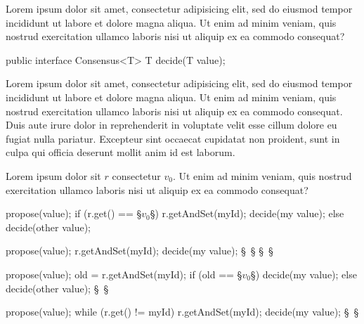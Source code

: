 \question 
\begin{splitquestion}{0.32}
Lorem ipsum dolor sit amet, consectetur adipisicing elit, sed do eiusmod tempor incididunt ut labore et dolore magna aliqua. Ut enim ad minim veniam, quis nostrud exercitation ullamco laboris nisi ut aliquip ex ea commodo consequat?
\nextpart
\begin{java}
public interface Consensus<T> {
    T decide(T value);
}
\end{java}
\end{splitquestion}
\begin{choices} %
\choice Lorem ipsum dolor sit amet, consectetur adipisicing elit, sed do eiusmod tempor incididunt ut labore et dolore magna aliqua.
\CHOICE Ut enim ad minim veniam, quis nostrud exercitation ullamco laboris nisi ut aliquip ex ea commodo consequat.
\choice Duis aute irure dolor in reprehenderit in voluptate velit esse cillum dolore eu fugiat nulla pariatur.
\choice Excepteur sint occaecat cupidatat non proident, sunt in culpa qui officia deserunt mollit anim id est laborum.
\end{choices}



\question
{}
Lorem ipsum dolor sit \(r\) consectetur \(v_0\).  Ut enim ad minim veniam, quis nostrud exercitation ullamco laboris nisi ut aliquip ex ea commodo consequat?
\begin{choices}[2]
\choice 
\begin{java}[bgcolor=white,samepage]
propose(value);
if (r.get() == §$v_0$§) {
  r.getAndSet(myId);
  decide(my value);
} else decide(other value);
\end{java}
\choice 
\begin{java}[bgcolor=white,samepage]
propose(value);
r.getAndSet(myId);
decide(my value);
§~§
§~§
\end{java}
\CHOICE 
\begin{java}[bgcolor=white,samepage]
propose(value);
old = r.getAndSet(myId);
if (old == §$v_0$§) decide(my value);
else decide(other value);
§~§
\end{java}
\choice 
\begin{java}[bgcolor=white,samepage]
propose(value);
while (r.get() != myId) {}
r.getAndSet(myId); 
decide(my value);
§~§
\end{java}
\end{choices}



